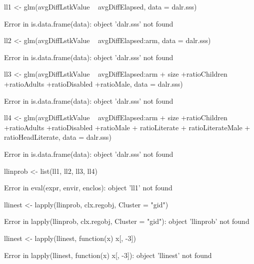 \begin{Schunk}
\begin{Sinput}
ll1 <- glm(avgDiffLstkValue ~ avgDiffElapsed, data = dalr.sss)
\end{Sinput}
\begin{Soutput}
Error in is.data.frame(data): object 'dalr.sss' not found
\end{Soutput}
\begin{Sinput}
ll2 <- glm(avgDiffLstkValue ~ avgDiffElapsed:arm, data = dalr.sss)
\end{Sinput}
\begin{Soutput}
Error in is.data.frame(data): object 'dalr.sss' not found
\end{Soutput}
\begin{Sinput}
ll3 <- glm(avgDiffLstkValue ~ avgDiffElapsed:arm + 
	size +ratioChildren +ratioAdults +ratioDisabled +ratioMale, data = dalr.sss)
\end{Sinput}
\begin{Soutput}
Error in is.data.frame(data): object 'dalr.sss' not found
\end{Soutput}
\begin{Sinput}
ll4 <- glm(avgDiffLstkValue ~ avgDiffElapsed:arm + 
	size +ratioChildren +ratioAdults +ratioDisabled +ratioMale +
	ratioLiterate + ratioLiterateMale + ratioHeadLiterate, data = dalr.sss)
\end{Sinput}
\begin{Soutput}
Error in is.data.frame(data): object 'dalr.sss' not found
\end{Soutput}
\begin{Sinput}
llinprob <- list(ll1, ll2, ll3, ll4)
\end{Sinput}
\begin{Soutput}
Error in eval(expr, envir, enclos): object 'll1' not found
\end{Soutput}
\begin{Sinput}
llinest <- lapply(llinprob, clx.regobj, Cluster = "gid")
\end{Sinput}
\begin{Soutput}
Error in lapply(llinprob, clx.regobj, Cluster = "gid"): object 'llinprob' not found
\end{Soutput}
\begin{Sinput}
llinest <- lapply(llinest, function(x) x[, -3])
\end{Sinput}
\begin{Soutput}
Error in lapply(llinest, function(x) x[, -3]): object 'llinest' not found
\end{Soutput}

\end{Schunk}
